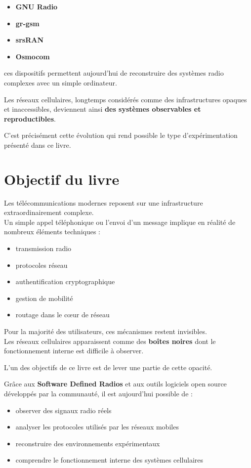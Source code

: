 \documentclass[
  french,
]{article}
\providecommand{\tightlist}{%
  \setlength{\itemsep}{0pt}\setlength{\parskip}{0pt}}
\begin{document}
\begin{itemize}
\tightlist
\item
  \textbf{GNU Radio}
\item
  \textbf{gr-gsm}
\item
  \textbf{srsRAN}
\item
  \textbf{Osmocom}
\end{itemize}

ces dispositifs permettent aujourd'hui de reconstruire des systèmes
radio complexes avec un simple ordinateur.

Les réseaux cellulaires, longtemps considérés comme des infrastructures
opaques et inaccessibles, deviennent ainsi \textbf{des systèmes
observables et reproductibles}.

C'est précisément cette évolution qui rend possible le type
d'expérimentation présenté dans ce livre.

\section{Objectif du livre}\label{objectif-du-livre}

Les télécommunications modernes reposent sur une infrastructure
extraordinairement complexe.\\
Un simple appel téléphonique ou l'envoi d'un message implique en réalité
de nombreux éléments techniques :

\begin{itemize}
\tightlist
\item
  transmission radio
\item
  protocoles réseau
\item
  authentification cryptographique
\item
  gestion de mobilité
\item
  routage dans le cœur de réseau
\end{itemize}

Pour la majorité des utilisateurs, ces mécanismes restent invisibles.\\
Les réseaux cellulaires apparaissent comme des \textbf{boîtes noires}
dont le fonctionnement interne est difficile à observer.

L'un des objectifs de ce livre est de lever une partie de cette opacité.

Grâce aux \textbf{Software Defined Radios} et aux outils logiciels open
source développés par la communauté, il est aujourd'hui possible de :

\begin{itemize}
\tightlist
\item
  observer des signaux radio réels
\item
  analyser les protocoles utilisés par les réseaux mobiles
\item
  reconstruire des environnements expérimentaux
\item
  comprendre le fonctionnement interne des systèmes cellulaires
\end{itemize}
\end{document}
